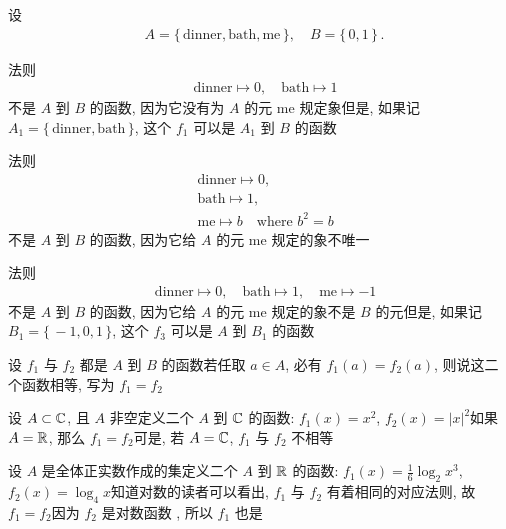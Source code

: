 \begin{example}
    设
    \begin{align*}
         & A = \{\, \text{dinner}, \text{bath}, \text{me} \,\}, \quad B = \{\, 0,1 \,\} \period
    \end{align*}

    法则
    \begin{align*}
         & \text{dinner} \mapsto 0, \quad \text{bath} \mapsto 1 \tag*{$f_1$:}
    \end{align*}
    不是 $A$ 到 $B$ 的函数, 因为它没有为 $A$ 的元 $\text{me}$ 规定象\period 但是, 如果记 $A_1 = \{\, \text{dinner}, \text{bath} \,\}$, 这个 $f_1$ 可以是 $A_1$ 到 $B$ 的函数\period

    法则
    \begin{align*}
         & \text{dinner} \mapsto 0, \tag*{$f_2$:}          \\
         & \text{bath} \mapsto 1,                          \\
         & \text{me} \mapsto b \quad \text{where } b^2 = b
    \end{align*}
    不是 $A$ 到 $B$ 的函数, 因为它给 $A$ 的元 $\text{me}$ 规定的象不唯一\period

    法则
    \begin{align*}
         & \text{dinner} \mapsto 0, \quad
        \text{bath} \mapsto 1, \quad
        \text{me} \mapsto -1 \tag*{$f_3$:}
    \end{align*}
    不是 $A$ 到 $B$ 的函数, 因为它给 $A$ 的元 $\text{me}$ 规定的象不是 $B$ 的元\period 但是, 如果记 $B_1 = \{\, -1,0,1 \,\}$, 这个 $f_3$ 可以是 $A$ 到 $B_1$ 的函数\period
\end{example}

\begin{definition}
    设 $f_1$ 与 $f_2$ 都是 $A$ 到 $B$ 的函数\period 若任取 $a \in A$, 必有 $f_1 (a) = f_2 (a)$, 则说这二个函数相等, 写为 $f_1 = f_2$\period
\end{definition}

\begin{example}
    设 $A \subset \mathbb{C}$, 且 $A$ 非空\period 定义二个 $A$ 到 $\mathbb{C}$ 的函数: $f_1 (x) = x^2$, $f_2 (x) = |x|^2$\period 如果 $A = \mathbb{R}$, 那么 $f_1 = f_2$\period 可是, 若 $A = \mathbb{C}$, $f_1$ 与 $f_2$ 不相等\period
\end{example}

\begin{example}
    设 $A$ 是全体正实数作成的集\period 定义二个 $A$ 到 $\mathbb{R}$ 的函数: $f_1 (x) = \frac16 \log_{2} {x^3}$, $f_2 (x) = \log_{4} {x}$\period 知道对数的读者可以看出, $f_1$ 与 $f_2$ 有着相同的对应法则, 故 $f_1 = f_2$\period 因为 $f_2$ 是对数函数 , 所以 $f_1$ 也是\period
\end{example}

